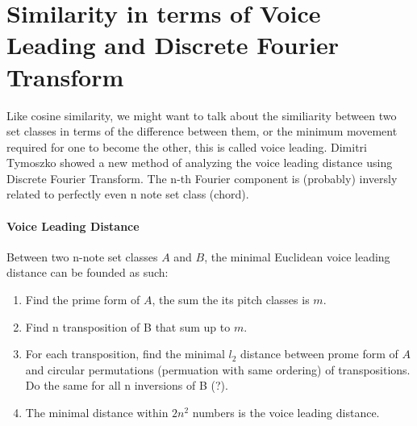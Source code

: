 \section*{Similarity in terms of Voice Leading and Discrete Fourier Transform}
Like cosine similarity, we might want to talk about the similiarity between 
two set classes in terms of the difference between them, or the minimum movement
required for one to become the other, this is called voice leading. Dimitri Tymoszko
showed a new method of analyzing the voice leading distance using Discrete Fourier Transform.
The n-th Fourier component is (probably) inversly related to perfectly even
n note set class (chord). 
\paragraph*{Voice Leading Distance}
Between two n-note set classes $A$ and $B$, the minimal Euclidean voice leading 
distance can be founded as such:
\begin{enumerate}
    \item Find the prime form of $A$, the sum the its pitch classes is $m$.
    \item Find n transposition of B that sum up to $m$.
    \item For each transposition, find the minimal $l_2$ distance between 
    prome form of $A$ and circular permutations (permuation with same ordering)
    of transpositions. Do the same for all n inversions of B (?).
    \item The minimal distance within $2n^2$ numbers is the voice leading distance.
\end{enumerate}
